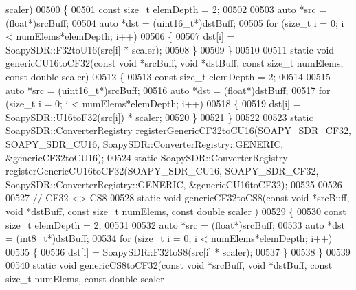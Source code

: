 \begin{DoxyCode}
      scaler)
00500 \{
00501   \textcolor{keyword}{const} \textcolor{keywordtype}{size\_t} elemDepth = 2;
00502 
00503   \textcolor{keyword}{auto} *src = (\textcolor{keywordtype}{float}*)srcBuff;
00504   \textcolor{keyword}{auto} *dst = (uint16\_t*)dstBuff;
00505   \textcolor{keywordflow}{for} (\textcolor{keywordtype}{size\_t} i = 0; i < numElems*elemDepth; i++)
00506     \{
00507       dst[i] = SoapySDR::F32toU16(src[i] * scaler);
00508     \}
00509 \}
00510 
00511 \textcolor{keyword}{static} \textcolor{keywordtype}{void} genericCU16toCF32(\textcolor{keyword}{const} \textcolor{keywordtype}{void} *srcBuff, \textcolor{keywordtype}{void} *dstBuff, \textcolor{keyword}{const} \textcolor{keywordtype}{size\_t} numElems, \textcolor{keyword}{const} \textcolor{keywordtype}{double} 
      scaler)
00512 \{
00513   \textcolor{keyword}{const} \textcolor{keywordtype}{size\_t} elemDepth = 2;
00514 
00515   \textcolor{keyword}{auto} *src = (uint16\_t*)srcBuff;
00516   \textcolor{keyword}{auto} *dst = (\textcolor{keywordtype}{float}*)dstBuff;
00517   \textcolor{keywordflow}{for} (\textcolor{keywordtype}{size\_t} i = 0; i < numElems*elemDepth; i++)
00518     \{
00519       dst[i] = SoapySDR::U16toF32(src[i]) * scaler;
00520     \}
00521 \}
00522 
00523 \textcolor{keyword}{static} SoapySDR::ConverterRegistry registerGenericCF32toCU16(SOAPY_SDR_CF32, 
      SOAPY_SDR_CU16, SoapySDR::ConverterRegistry::GENERIC, &genericCF32toCU16);
00524 \textcolor{keyword}{static} SoapySDR::ConverterRegistry registerGenericCU16toCF32(SOAPY_SDR_CU16, 
      SOAPY_SDR_CF32, SoapySDR::ConverterRegistry::GENERIC, &genericCU16toCF32);
00525 
00526 
00527 \textcolor{comment}{// CF32 <> CS8}
00528 \textcolor{keyword}{static} \textcolor{keywordtype}{void} genericCF32toCS8(\textcolor{keyword}{const} \textcolor{keywordtype}{void} *srcBuff, \textcolor{keywordtype}{void} *dstBuff, \textcolor{keyword}{const} \textcolor{keywordtype}{size\_t} numElems, \textcolor{keyword}{const} \textcolor{keywordtype}{double} scaler
      )
00529 \{
00530   \textcolor{keyword}{const} \textcolor{keywordtype}{size\_t} elemDepth = 2;
00531 
00532   \textcolor{keyword}{auto} *src = (\textcolor{keywordtype}{float}*)srcBuff;
00533   \textcolor{keyword}{auto} *dst = (int8\_t*)dstBuff;
00534   \textcolor{keywordflow}{for} (\textcolor{keywordtype}{size\_t} i = 0; i < numElems*elemDepth; i++)
00535     \{
00536       dst[i] = SoapySDR::F32toS8(src[i] * scaler);
00537     \}
00538 \}
00539 
00540 \textcolor{keyword}{static} \textcolor{keywordtype}{void} genericCS8toCF32(\textcolor{keyword}{const} \textcolor{keywordtype}{void} *srcBuff, \textcolor{keywordtype}{void} *dstBuff, \textcolor{keyword}{const} \textcolor{keywordtype}{size\_t} numElems, \textcolor{keyword}{const} \textcolor{keywordtype}{double} scaler

\end{DoxyCode}
